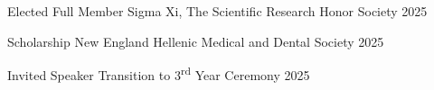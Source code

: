 

\vspace{-2mm}
\begin{cvhonors}

  \cvhonor
  {Elected Full Member} %
  {Sigma Xi, The Scientific Research Honor Society} %
  {2025} %

  \cvhonor
  {Scholarship} %
  {New England Hellenic Medical and Dental Society} %
  {2025} %

  \cvhonor
  {Invited Speaker} %
  {Transition to 3\textsuperscript{rd} Year Ceremony} %
  {2025} %

\end{cvhonors}
